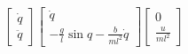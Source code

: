 \documentclass[preview]{standalone}
\begin{document}
\begin{align*}
\begin{bmatrix}\dot{q} \\ \ddot{q}\end{bmatrix} \begin{bmatrix}\dot{q} \\ -\frac{g}{l}\sin{q}-\frac{b}{ml^2}\dot{q}\end{bmatrix} \begin{bmatrix}0 \\ \frac{u}{ml^2}\end{bmatrix}
\end{align*}
\end{document}
